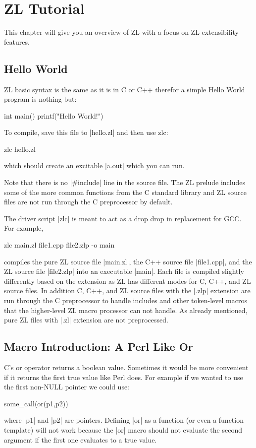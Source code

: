 \chapter{ZL Tutorial}
\label{zl-tutorial}

This chapter will give you an overview of ZL with a focus on ZL
extensibility features.

\section{Hello World}

ZL basic syntax is the same as it is in C or C++ therefor a simple
Hello World program is nothing but:

\begin{code}
int main() {
  printf("Hello World!")
}
\end{code}

To compile, save this file to |hello.zl| and then use zlc:
\begin{code}
zlc hello.zl
\end{code}
which should create an excitable |a.out| which you can run.

Note that there is no |#include| line in the source file.  The ZL
prelude includes some of the more common functions from the C standard
library and ZL source files are not run through the C preprocessor
by default.

The driver script |zlc| is meant to act as a drop drop in replacement
for GCC.  For example,
\begin{code}
zlc main.zl file1.cpp file2.zlp -o main
\end{code}
compiles the pure ZL source file |main.zl|, the C++ source file
|file1.cpp|, and the ZL source file |file2.zlp| into an executable
|main|.  Each file is compiled slightly differently based on the
extension as ZL has different modes for C, C++, and ZL source files.
In addition C, C++, and ZL source files with the |.zlp| extension are
run through the C preprocessor to handle includes and other
token-level macros that the higher-level ZL macro processor can not
handle.  As already mentioned, pure ZL files with |.zl| extension are
not preprocessed.

\section{Macro Introduction: A Perl Like Or}
\label{pattern-macros}

C's or operator returns a boolean value.  Sometimes it would be more
convenient if it returns the first true value like Perl does.  For
example if we wanted to use the first non-NULL pointer we could use:
\begin{code}
some_call(or(p1,p2))
\end{code}
where |p1| and |p2| are pointers.  Defining |or| as a function (or even
a function template) will not work because the |or| macro should not
evaluate the second argument if the first one evaluates to a true
value.

